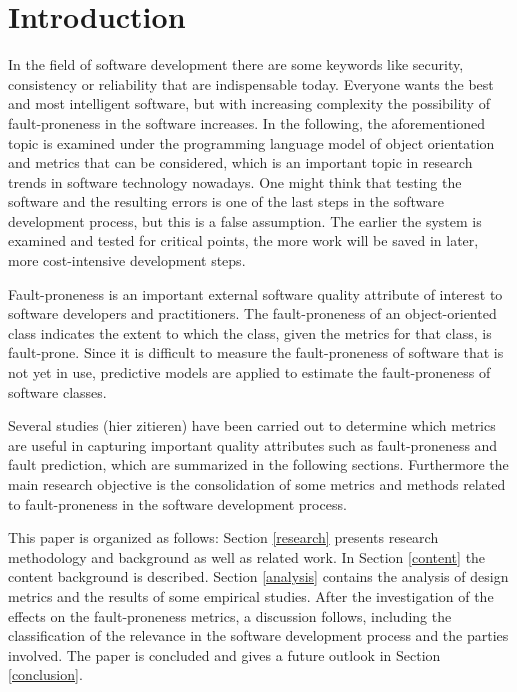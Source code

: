\section{Introduction}

In the field of software development there are some keywords like security, consistency or reliability that are indispensable today. Everyone wants the best and most intelligent software, but with increasing complexity the possibility of fault-proneness in the software increases. In the following, the aforementioned topic is examined under the programming language model of object orientation and metrics that can be considered, which is an important topic in research trends in software technology nowadays.
One might think that testing the software and the resulting errors is one of the last steps in the software development process, but this is a false assumption. The earlier the system is examined and tested for critical points, the more work will be saved in later, more cost-intensive development steps.

Fault-proneness is an important external software quality attribute of interest to software developers and practitioners. The fault-proneness of an object-oriented class indicates the extent to which the class, given the metrics for that class, is fault-prone. Since it is difficult to measure the fault-proneness of software that is not yet in use, predictive models are applied to estimate the fault-proneness of software classes.

Several studies (hier zitieren) have been carried out to determine which metrics are useful in capturing important quality attributes such as fault-proneness  and fault prediction, which are summarized in the following sections.
Furthermore the main research objective is the consolidation of some metrics and methods related to fault-proneness in the software development process.

This paper is organized as follows: Section \ref{research} presents research methodology and background as well as related work. In Section \ref{content} the content background is described. Section \ref{analysis} contains the analysis of design metrics and the results of some empirical studies. After the investigation of the effects on the fault-proneness metrics, a discussion follows, including the classification of the relevance in the software development process and the parties involved. The paper is concluded and gives a future outlook in Section \ref{conclusion}.